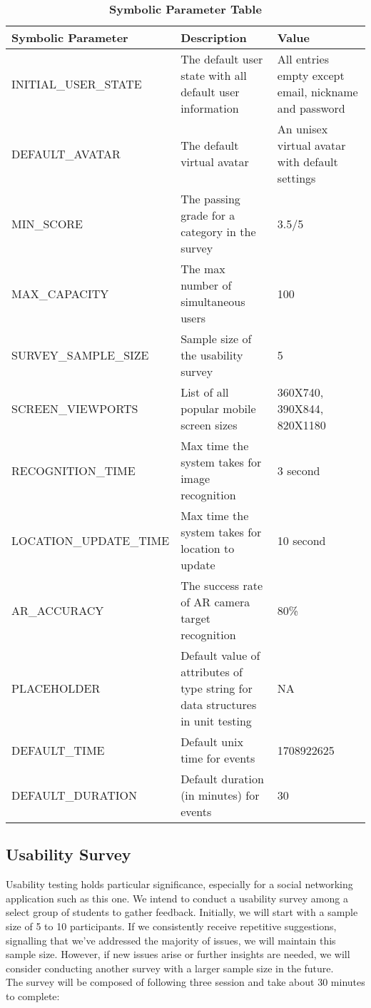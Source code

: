 \documentclass[12pt, titlepage]{article}
\begin{document}
\begin{table}[H]
\caption{\bf Symbolic Parameter Table}
\begin{tabular}{|p{0.4\linewidth} | p{0.3\linewidth}| p{0.3\linewidth} |}
\hline
\multicolumn{1}{|l}{\bfseries Symbolic Parameter} & \multicolumn{1}{|l|}{\bfseries Description} & \multicolumn{1}{l|}{\bfseries Value}\\
\hline
INITIAL\_USER\_STATE & The default user state with all default user information & All entries empty except email, nickname and password \\
\hline
DEFAULT\_AVATAR & The default virtual avatar & An unisex virtual avatar with default settings \\
\hline
MIN\_SCORE & The passing grade for a category in the survey & 3.5/5\\
\hline
MAX\_CAPACITY & The max number of simultaneous users & 100\\
\hline
SURVEY\_SAMPLE\_SIZE & Sample size of the usability survey & 5\\
\hline
SCREEN\_VIEWPORTS & List of all popular mobile screen sizes & 360X740, 390X844, 820X1180\\
\hline
RECOGNITION\_TIME & Max time the system takes for image recognition & 3 second\\
\hline
LOCATION\_UPDATE\_TIME & Max time the system takes for location to update & 10 second\\
\hline
AR\_ACCURACY & The success rate of AR camera target recognition & 80\%\\
\hline
PLACEHOLDER & Default value of attributes of type string for data structures in unit testing & NA\\
\hline
DEFAULT\_TIME & Default unix time for events & 1708922625\\
\hline
DEFAULT\_DURATION & Default duration (in minutes) for events & 30\\
\hline
\end{tabular}
\end{table}

\subsection{Usability Survey}
\label{sec:survey}
Usability testing holds particular significance, especially for a social networking application such as this one. We intend to conduct a usability survey among a select group of students to gather feedback. Initially, we will start with a sample size of 5 to 10 participants. If we consistently receive repetitive suggestions, signalling that we've addressed the majority of issues, we will maintain this sample size. However, if new issues arise or further insights are needed, we will consider conducting another survey with a larger sample size in the future.\\
The survey will be composed of following three session and take about 30 minutes to complete:
\end{document}
